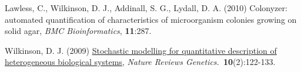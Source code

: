 \documentclass[mathserif,handout]{beamer}
\begin{document}
{\begin{thebibliography}{}
Lawless, C., Wilkinson, D. J., Addinall, S. G., Lydall, D. A. (2010)
\alert{Colonyzer: automated quantification of characteristics of
  microorganism colonies growing on solid agar}, {\em BMC Bioinformatics}, \textbf{11}:287. 







Wilkinson,
D. J. (2009) \alert{\href{http://dx.doi.org/10.1038/nrg2509}{Stochastic modelling for quantitative description of
heterogeneous biological systems}}, {\em Nature Reviews Genetics.\/}~\textbf{10}(2):122-133.



\end{thebibliography}}
\end{document}
